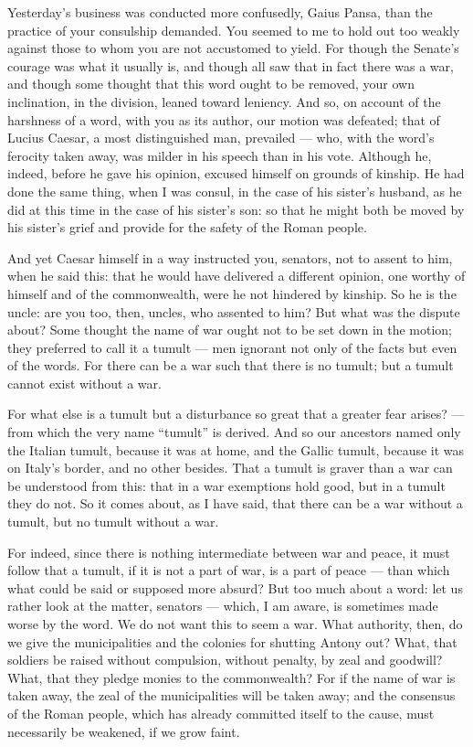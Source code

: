
 Yesterday's business was conducted more confusedly, Gaius Pansa, than the practice of your consulship demanded. You seemed to me to hold out too weakly against those to whom you are not accustomed to yield. For though the Senate's courage was what it usually is, and though all saw that in fact there was a war, and though some thought that this word ought to be removed, your own inclination, in the division, leaned toward leniency. And so, on account of the harshness of a word, with you as its author, our motion was defeated; that of Lucius Caesar, a most distinguished man, prevailed --- who, with the word's ferocity taken away, was milder in his speech than in his vote. Although he, indeed, before he gave his opinion, excused himself on grounds of kinship. He had done the same thing, when I was consul, in the case of his sister's husband, as he did at this time in the case of his sister's son: so that he might both be moved by his sister's grief and provide for the safety of the Roman people.

 And yet Caesar himself in a way instructed you, senators, not to assent to him, when he said this: that he would have delivered a different opinion, one worthy of himself and of the commonwealth, were he not hindered by kinship. So he is the uncle: are you too, then, uncles, who assented to him? But what was the dispute about? Some thought the name of war ought not to be set down in the motion; they preferred to call it a tumult --- men ignorant not only of the facts but even of the words. For there can be a war such that there is no tumult; but a tumult cannot exist without a war.

 For what else is a tumult but a disturbance so great that a greater fear arises? --- from which the very name ``tumult'' is derived. And so our ancestors named only the Italian tumult, because it was at home, and the Gallic tumult, because it was on Italy's border, and no other besides. That a tumult is graver than a war can be understood from this: that in a war exemptions hold good, but in a tumult they do not. So it comes about, as I have said, that there can be a war without a tumult, but no tumult without a war.

 For indeed, since there is nothing intermediate between war and peace, it must follow that a tumult, if it is not a part of war, is a part of peace --- than which what could be said or supposed more absurd? But too much about a word: let us rather look at the matter, senators --- which, I am aware, is sometimes made worse by the word. We do not want this to seem a war. What authority, then, do we give the municipalities and the colonies for shutting Antony out? What, that soldiers be raised without compulsion, without penalty, by zeal and goodwill? What, that they pledge monies to the commonwealth? For if the name of war is taken away, the zeal of the municipalities will be taken away; and the consensus of the Roman people, which has already committed itself to the cause, must necessarily be weakened, if we grow faint.


